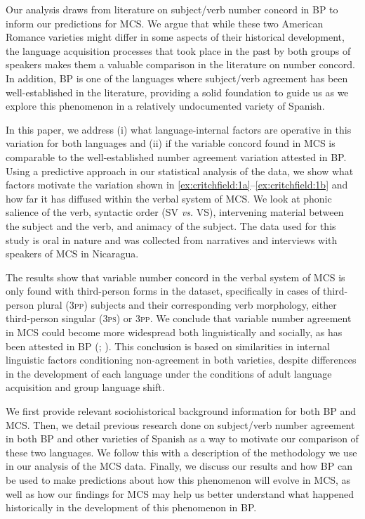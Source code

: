 \documentclass[output=paper,colorlinks,citecolor=brown,
]{langscibook}
\begin{document}
Our analysis draws from literature on subject/verb number concord in BP to inform our predictions for MCS. We argue that while these two American Romance varieties might differ in some aspects of their historical development, the language acquisition processes that took place in the past by both groups of speakers makes them a valuable comparison in the literature on number concord. In addition, BP is one of the languages where subject/verb agreement has been well-established in the literature, providing a solid foundation to guide us as we explore this phenomenon in a relatively undocumented variety of Spanish.


In this paper, we address (i) what language-internal factors are operative in this variation for both languages and (ii) if the variable concord found in MCS is comparable to the well-established number agreement variation attested in BP. Using a predictive approach in our statistical analysis of the data, we show what factors motivate the variation shown in \ref{ex:critchfield:1a}--\ref{ex:critchfield:1b} and how far it has diffused within the verbal system of MCS. We look at phonic salience of the verb, syntactic order (SV \textit{vs.} VS), intervening material between the subject and the verb, and animacy of the subject. The data used for this study is oral in nature and was collected from narratives and interviews with speakers of MCS in Nicaragua.

The results show that variable number concord in the verbal system of MCS is only found with third-person forms in the dataset, specifically in cases of third-person plural (\textsc{3pp}) subjects and their corresponding verb morphology, either third-person singular (\textsc{3ps}) or \textsc{3pp}. We conclude that variable number agreement in MCS could become more widespread both linguistically and socially, as has been attested in BP (\citealt{mendes2015variable}; \citealt{naro2013remodeling}). This conclusion is based on similarities in internal linguistic factors conditioning non-agreement in both varieties, despite differences in the development of each language under the conditions of adult language acquisition and group language shift.

We first provide relevant sociohistorical background information for both BP and MCS. Then, we detail previous research done on subject/verb number agreement in both BP and other varieties of Spanish as a way to motivate our comparison of these two languages. We follow this with a description of the methodology we use in our analysis of the MCS data. Finally, we discuss our results and how BP can be used to make predictions about how this phenomenon will evolve in MCS, as well as how our findings for MCS may help us better understand what happened historically in the development of this phenomenon in BP.
\end{document}

